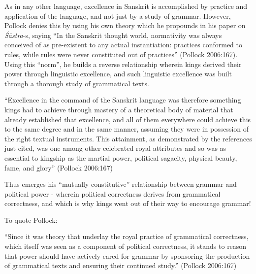 As in any other language, excellence in Sanskrit is accomplished by practice and application of the language, and not just by a study of grammar. However, Pollock denies this by using his own theory which he propounds in his paper on {\sl Śāstra}-s, saying ``In the Sanskrit thought world, normativity was always conceived of as pre-existent to any actual instantiation: practices conformed to rules, while rules were never constituted out of practices'' (Pollock 2006:167). Using this ``norm'', he builds a reverse relationship wherein kings derived their power through linguistic excellence, and such linguistic excellence was built through a thorough study of grammatical texts.
\begin{myquote}
``Excellence in the command of the Sanskrit language was therefore something kings had to achieve through mastery of a theoretical body of material that already established that excellence, and all of them everywhere could achieve this to the same degree and in the same manner, assuming they were in possession of the right textual instruments. This attainment, as demonstrated by the references just cited, was one among other celebrated royal attributes and so was as essential to kingship as the martial power, political sagacity, physical beauty, fame, and glory''
\hfill (Pollock 2006:167)
\end{myquote}

Thus emerges his ``mutually constitutive'' relationship between grammar and political power - wherein political correctness derives from grammatical correctness, and which is why kings went out of their way to encourage grammar! 

\newpage

To quote Pollock:
\begin{myquote}
``Since it was theory that underlay the royal practice of grammatical correctness, which itself was seen as a component of political correctness, it stands to reason that power should have actively cared for grammar by sponsoring the production of grammatical texts and ensuring their continued study.''
\hfill (Pollock 2006:167)
\end{myquote}

